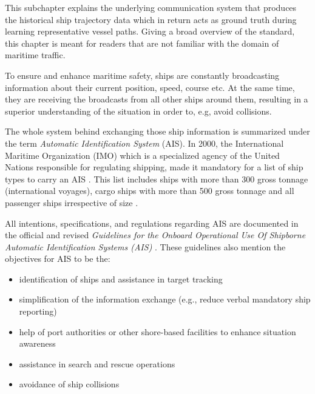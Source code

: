 This subchapter explains the underlying communication system that produces the historical ship trajectory data which in return acts as ground truth during learning representative vessel paths. Giving a broad overview of the standard, this chapter is meant for readers that are not familiar with the domain of maritime traffic.
\par
To ensure and enhance maritime safety, ships are constantly broadcasting information about their current position, speed, course etc. At the same time, they are receiving the broadcasts from all other ships around them, resulting in a superior understanding of the situation in order to, e.g, avoid collisions. 
\par
The whole system behind exchanging those ship information is summarized under the term \textit{Automatic Identification System} (AIS). In 2000, the International Maritime Organization (IMO) which is a specialized agency of the United Nations responsible for regulating shipping, made it mandatory for a list of ship types to carry an AIS \cite[]{imo}. This list includes ships 
with more than 300 gross tonnage (international voyages), cargo ships with more than 500 gross tonnage and all passenger ships irrespective of size \cite[]{imo}.
\par
All intentions, specifications, and regulations regarding AIS are documented in the official and revised \textit{Guidelines for the Onboard Operational Use Of
Shipborne Automatic Identification Systems (AIS)} \cite[]{international2015revised}. These guidelines also mention the objectives for AIS to be the:
\begin{itemize}
    \item identification of ships and assistance in target tracking
    \item simplification of the information exchange (e.g., reduce verbal mandatory ship reporting)
    \item help of port authorities or other shore-based facilities to enhance situation awareness
    \item assistance in search and rescue operations
    \item avoidance of ship collisions
\end{itemize}

